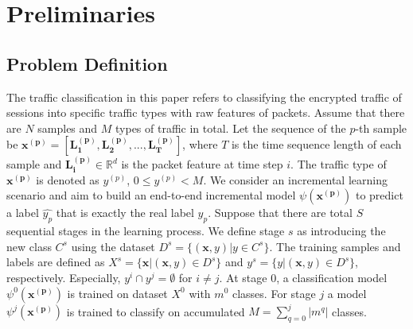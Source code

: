 \section{Preliminaries}
\label{sec:Preliminaries}
\subsection{Problem Definition}
The traffic classification in this paper refers to classifying the encrypted traffic of sessions into specific traffic types with raw features of packets.  
Assume that there are $N$ samples and $M$ types of traffic in total.  
Let the sequence of the $p$-th sample be $\mathbf{x^{(p)}} = [\mathbf{L_1^{(p)}}, \mathbf{L_2^{(p)}}, ..., \mathbf{L_T^{(p)}}]$, where $T$ is the time sequence length of each sample and $\mathbf{L_i^{(p)}} \in \mathbb{R}^d$ is the packet feature at time step $i$.  
The traffic type of $\mathbf{x^{(p)}}$ is denoted as $y^{(p)}$, $0 \le y^{(p)} < M$. 
We consider an incremental learning scenario and aim to build an end-to-end incremental model $\psi{(\mathbf{x^{(p)}})}$ to predict a label $\hat{y_p}$ that is exactly the real label $y_p$. 
Suppose that there are total $S$ sequential stages in the learning process. 
We define stage $s$ as introducing the new class $C^s$ using the dataset $D^s = \{(\mathbf{x}, y) | y \in C^s\}$.
The training samples and labels are defined as $X^s = \{\mathbf{x}|(\mathbf{x}, y) \in D^s\}$ and $y^s = \{y|(\mathbf{x}, y) \in D^s\}$, respectively.
Especially, $y^i \cap y^j = \emptyset$ for $i \neq j$.
At stage 0, a classification model $\psi^0(\mathbf{x^{(p)}})$ is trained on dataset $X^0$ with $m^0$ classes. 
For stage $j$ a model $\psi^j(\mathbf{x^{(p)}})$ is trained to classify on accumulated $M=\sum_{q=0}^j |m^q|$ classes. 

